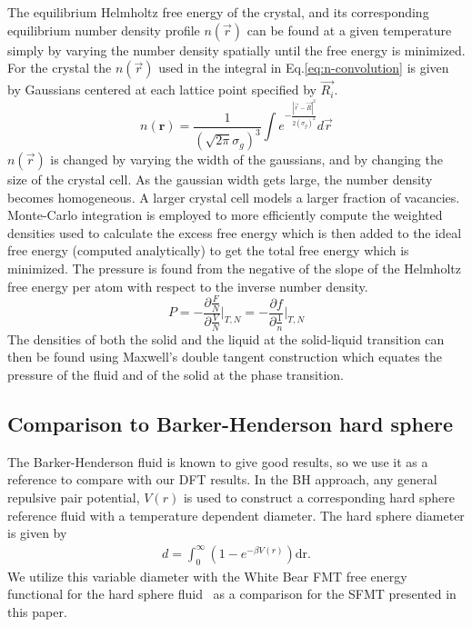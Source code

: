 \documentclass[letterpaper,twocolumn,amsmath,amssymb,prb]{revtex4-1}
\begin{document}
The equilibrium Helmholtz free energy of the crystal, and its corresponding equilibrium number density profile $n(\vec{r})$ can be found at a given temperature simply by varying the number density spatially 
until the free energy
is minimized. For the crystal the $n(\vec{r})$ used in the integral in Eq.\ref{eq:n-convolution} is given by Gaussians centered at each lattice point specified by $\vec{R_i}$. 
\begin{equation}n(\textbf{r})= \frac{1}{\left(\sqrt{2\pi}\sigma_{g}\right)^3}\int{e^{-\frac{|\vec{r}-\vec{R}|^2}{2\left(\sigma_g\right)^2}}d{\vec{r}}}  \end{equation}  
$n(\vec{r})$ is changed by varying the width of the gaussians, \color{red} and by changing the size of the crystal cell. \color{black}As the gaussian width gets large, the number density becomes homogeneous. \color{red}A larger crystal cell models a larger fraction of vacancies. \color{black} Monte-Carlo integration is employed to more efficiently compute the weighted densities used to calculate the excess free energy which is then added to the ideal free energy (computed analytically) to get the total free energy which is minimized. The pressure is found from the negative of the slope of the Helmholtz free energy per atom with respect to the inverse number density. \begin{equation}{P=-\frac{\partial{\frac{F}{N}}}{\partial{\frac{V}{N}}}\bigg|_{T,N} = -\frac{\partial{f}}{\partial{\frac{1}{n}}}\bigg|_{T,N}}\end{equation} 
The densities of both the solid and the liquid at the solid-liquid transition can then be found using Maxwell's double tangent construction which equates the pressure of the fluid and of the solid at the phase transition.




\subsection{Comparison to Barker-Henderson hard sphere}

The Barker-Henderson fluid is known to give good results, so we use it as a reference to compare with our DFT results. 
In the BH approach, any general
repulsive pair potential, $V(r)$ is used to construct a corresponding hard
sphere reference fluid with a temperature dependent diameter. The hard
sphere diameter is given by
\begin{align}
  d = \int_0^{\infty}\left( 1 - e^{-\beta V(r)} \right)\mathrm{dr}.
  \label{eq:bh-diameter}
\end{align}
We utilize this variable diameter with the White Bear FMT free energy
functional for the hard sphere fluid~\cite{roth2002whitebear} as a
comparison for the SFMT presented in this paper.
\end{document}
